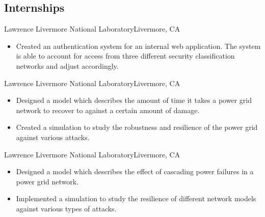 \documentclass[11pt,a4paper,sans]{moderncv}        %
\begin{document}

\vspace{2pt}

\vspace{2pt}

\subsection{Internships}
\vspace{6pt}

{Lawrence Livermore National Laboratory}{Livermore, CA}{}{}

\begin{itemize}
	\item Created an authentication system for an internal web application. The system is able to account for access from three different security classification networks and adjust accordingly. 
\end{itemize}

\vspace{5pt}

{Lawrence Livermore National Laboratory}{Livermore, CA}{}{}

\begin{itemize}
    \item Designed a model which describes the amount of time it takes a power grid network to recover to against a certain amount of damage.

	\item Created a simulation to study the robustness and resilience of the power grid against various attacks.
\end{itemize}

\vspace{5pt}

{Lawrence Livermore National Laboratory}{Livermore, CA}{}{}

\begin{itemize}
	\item Designed a model which describes the effect of cascading power failures in a power grid network.
	
	\item Implemented a simulation to study the resilience of different network models against various types of attacks.
\end{itemize}
\end{document}

